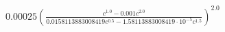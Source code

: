 $\displaystyle 0.00025 \left(\frac{c^{1.0} - 0.001 c^{2.0}}{0.0158113883008419 c^{0.5} - 1.58113883008419 \cdot 10^{-5} c^{1.5}}\right)^{2.0}$
